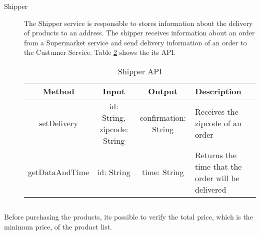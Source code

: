 \begin{description}
\begin{table}[htdp]
\begin{center}
\begin{tabular}{|c|m{3.5cm}|m{3.5cm}|m{4cm}|}
	\end{tabular}
	\end{center}
	\label{customerapi}
	\end{table}%

\item[Shipper] The Shipper service is responsible to stores information about the delivery of products to an address. The shipper receives information about an order from a Supermarket service and send delivery information of an order to the Custumer Service. Table \ref{shipperapi} shows the its API.

\begin{table}[htdp]
\caption{Shipper API}
\begin{center}
	\begin{tabular}{|c|c|c|m{4cm}|}
	\hline
	Method			& Input					& Output 					& Description \\ \hline
	setDelivery		& id: String, zipcode: String	& confirmation: String		& Receives the zipcode of an order \\ \hline
	getDataAndTime	& id: String				& time: String				& Returns the time that the order will be delivered \\ \hline
\end{tabular}
\end{center}
\label{shipperapi}
\end{table}%



\end{description}


\subsection{}
Before purchasing the products, its possible to verify the total price, which is the minimum price, of the product list. 